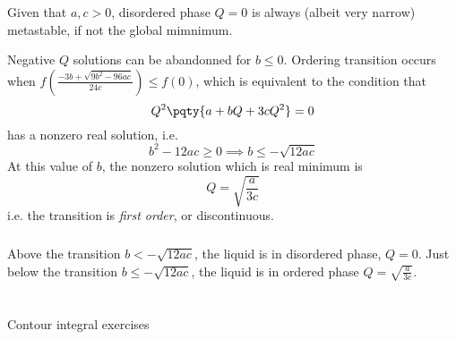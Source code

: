 \documentclass[12pt]{article}
\begin{document}
        Given that \(a,c > 0\), disordered phase \(Q = 0\) is always (albeit very narrow) metastable, if not the global mimnimum. 
        \begin{center}
            \def\svgwidth{250pt}
        \end{center}
        Negative \(Q\) solutions can be abandonned for \(b\leq 0\). Ordering transition occurs when \(f(\frac{ - 3b + \sqrt{9b^2 - 96ac}}{24c})\leq f(0)\), which is equivalent to the condition that\[
            Q^2\pqty{a + bQ + 3cQ^2} = 0
        \] has a nonzero real solution, i.e. \[
            b^2 - 12ac \geq 0 \implies b\leq - \sqrt{12ac}
        \]
        At this value of \(b\), the nonzero solution which is real minimum is
        \[
            Q = \sqrt{\frac{a}{3c}} 
        \]
        i.e. the transition is \emph{first order}, or discontinuous.
        \subsubsection{} Above the transition \(b < - \sqrt{12ac}\), the liquid is in disordered phase, \(Q = 0\). Just below the transition \(b\leq - \sqrt{12ac}\), the liquid is in ordered phase \(Q = \sqrt{\frac{a}{3c}}\).
    \newpage
    \section{}
    \subsection{} Contour integral exercises 
\end{document}
